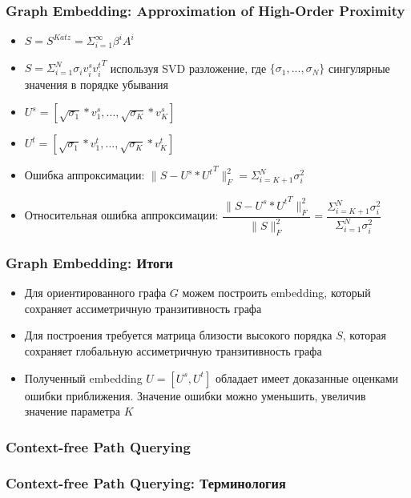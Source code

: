 \documentclass[xcolor=table,english]{beamer}
\begin{document}
\begin{frame}[fragile] \frametitle{Graph Embedding: Approximation of High-Order Proximity}
    \begin{itemize}
        \item $S = S^{Katz} = \Sigma_{i=1}^{\infty} \beta^i A^i$
        \item $S = \Sigma_{i=1}^N \sigma_i v_i^s {v_i^t}^T$ используя SVD разложение, где $\{\sigma_1, ... , \sigma_N\}$ сингулярные значения в порядке убывания
        \item $U^s = [ \sqrt{\sigma_1} * v_1^s, ..., \sqrt{\sigma_K} * v_K^s ]$
        \item $U^t = [ \sqrt{\sigma_1} * v_1^t, ..., \sqrt{\sigma_K} * v_K^t ]$
        \item Ошибка аппроксимации: $\| S - U^s * {U^t}^T \|^2_F = \Sigma_{i=K+1}^N \sigma_i^2$
        \item Относительная ошибка аппроксимации: $\dfrac{\| S - U^s * {U^t}^T \|^2_F}{\| S \|^2_F} = \dfrac{\Sigma_{i=K+1}^N \sigma_i^2}{\Sigma_{i=1}^N \sigma_i^2}$
    \end{itemize}
\end{frame}

\begin{frame}[fragile] \frametitle{Graph Embedding: Итоги}
    \begin{itemize}
        \item Для ориентированного графа $G$ можем построить embedding, который сохраняет ассиметричную транзитивность графа
        \item Для построения требуется матрица близости высокого порядка $S$, которая сохраняет 
        глобальную ассиметричную транзитивность графа
        \item Полученный embedding $U = [U^s, U^t]$ обладает имеет доказанные оценками ошибки приближения. Значение ошибки можно уменьшить, увеличив значение параметра $K$
    \end{itemize}
\end{frame}

\begin{frame}[fragile] \frametitle{Context-free Path Querying}
    
\end{frame}

\begin{frame}[fragile] \frametitle{Context-free Path Querying: Терминология}
    
\end{frame}
\end{document}
